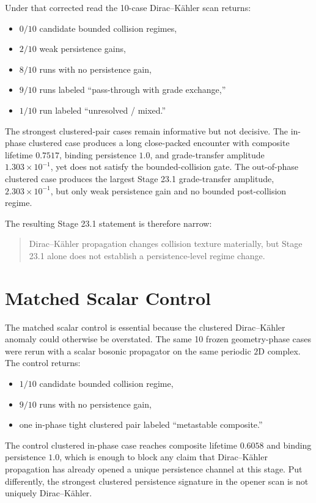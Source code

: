 \documentclass[11pt]{article}
\begin{document}
Under that corrected read the 10-case Dirac--K\"ahler scan returns:
\begin{itemize}
\item $0/10$ candidate bounded collision regimes,
\item $2/10$ weak persistence gains,
\item $8/10$ runs with no persistence gain,
\item $9/10$ runs labeled ``pass-through with grade exchange,''
\item $1/10$ run labeled ``unresolved / mixed.''
\end{itemize}

The strongest clustered-pair cases remain informative but not decisive. The in-phase clustered case produces a long close-packed encounter with composite lifetime $0.7517$, binding persistence $1.0$, and grade-transfer amplitude $1.303\times10^{-1}$, yet does not satisfy the bounded-collision gate. The out-of-phase clustered case produces the largest Stage 23.1 grade-transfer amplitude, $2.303\times10^{-1}$, but only weak persistence gain and no bounded post-collision regime.

The resulting Stage 23.1 statement is therefore narrow:
\begin{quote}
Dirac--K\"ahler propagation changes collision texture materially, but Stage 23.1 alone does not establish a persistence-level regime change.
\end{quote}

\section{Matched Scalar Control}

The matched scalar control is essential because the clustered Dirac--K\"ahler anomaly could otherwise be overstated. The same 10 frozen geometry-phase cases were rerun with a scalar bosonic propagator on the same periodic $2$D complex. The control returns:
\begin{itemize}
\item $1/10$ candidate bounded collision regime,
\item $9/10$ runs with no persistence gain,
\item one in-phase tight clustered pair labeled ``metastable composite.''
\end{itemize}

The control clustered in-phase case reaches composite lifetime $0.6058$ and binding persistence $1.0$, which is enough to block any claim that Dirac--K\"ahler propagation has already opened a unique persistence channel at this stage. Put differently, the strongest clustered persistence signature in the opener scan is not uniquely Dirac--K\"ahler.
\end{document}

